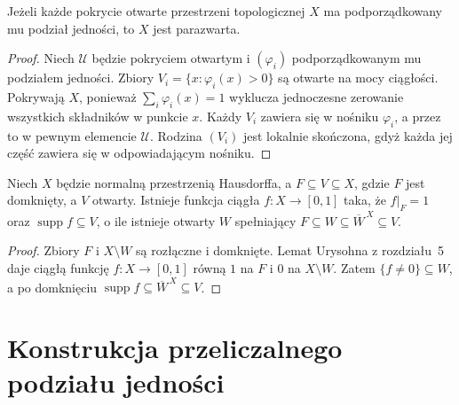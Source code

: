 \begin{stwierdzenie}
\label{prop:topog-parazwartosc-jednosc-pokrycie}
Jeżeli każde pokrycie otwarte przestrzeni
topologicznej $X$ ma podporządkowany
mu podział jedności, to $X$ jest parazwarta.
\end{stwierdzenie}
\begin{proof}
Niech $\mathcal U$ będzie pokryciem otwartym
i $(\varphi_i)$ podporządkowanym mu
podziałem jedności. Zbiory
$V_i=\{x:\varphi_i(x)>0\}$ są otwarte
na mocy ciągłości. Pokrywają $X$,
ponieważ $\sum_i\varphi_i(x)=1$
wyklucza jednoczesne zerowanie
wszystkich składników w punkcie $x$.
Każdy $V_i$ zawiera się w nośniku
$\varphi_i$, a przez to w pewnym
elemencie $\mathcal U$.
Rodzina $(V_i)$ jest lokalnie skończona,
gdyż każda jej część zawiera się
w odpowiadającym nośniku.
\end{proof}

\begin{lemat}
\label{lem:topog-parazwartosc-odciecia}
Niech $X$ będzie normalną przestrzenią
Hausdorffa, a $F\subseteq V\subseteq X$,
gdzie $F$ jest domknięty, a $V$ otwarty.
Istnieje funkcja ciągła $f:X\to[0,1]$
taka, że $f|_F=1$ oraz
$\operatorname{supp}f\subseteq V$,
o ile istnieje otwarty $W$ spełniający
$F\subseteq W\subseteq\overline W^{\,X}
\subseteq V$.
\end{lemat}
\begin{proof}
Zbiory $F$ i $X\setminus W$ są
rozłączne i domknięte. Lemat Urysohna
z rozdziału~5 daje ciągłą funkcję
$f:X\to[0,1]$ równą $1$ na $F$
i $0$ na $X\setminus W$.
Zatem $\{f\ne0\}\subseteq W$,
a po domknięciu
$\operatorname{supp}f
\subseteq\overline W^{\,X}\subseteq V$.
\end{proof}

\section{Konstrukcja przeliczalnego podziału jedności}
\label{sec:topog-parazwartosc-konstrukcja}


